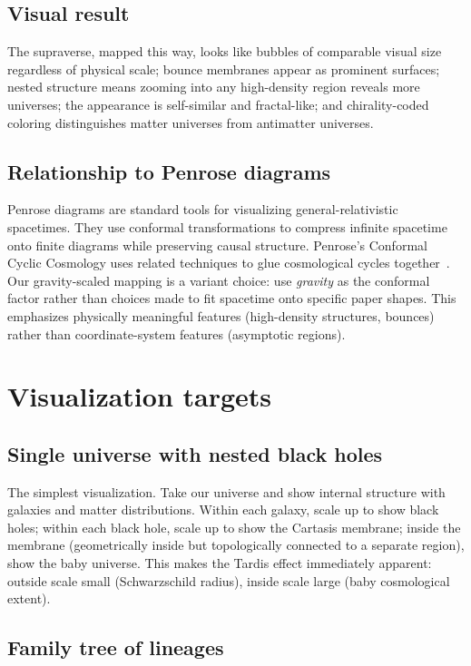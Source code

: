\subsection{Visual result}

The supraverse, mapped this way, looks like bubbles of comparable visual size
regardless of physical scale; bounce membranes appear as prominent surfaces;
nested structure means zooming into any high-density region reveals more
universes; the appearance is self-similar and fractal-like; and chirality-coded
coloring distinguishes matter universes from antimatter universes.

\subsection{Relationship to Penrose diagrams}

Penrose diagrams are standard tools for visualizing general-relativistic
spacetimes. They use conformal transformations to compress infinite spacetime
onto finite diagrams while preserving causal structure. Penrose's Conformal
Cyclic Cosmology uses related techniques to glue cosmological cycles
together~\citep{penrose2010}. Our gravity-scaled mapping is a variant choice: use
\emph{gravity} as the conformal factor rather than choices made to fit spacetime
onto specific paper shapes. This emphasizes physically meaningful features
(high-density structures, bounces) rather than coordinate-system features
(asymptotic regions).

\section{Visualization targets}

\subsection{Single universe with nested black holes}

The simplest visualization. Take our universe and show internal structure with
galaxies and matter distributions. Within each galaxy, scale up to show black
holes; within each black hole, scale up to show the Cartasis membrane; inside the
membrane (geometrically inside but topologically connected to a separate region),
show the baby universe. This makes the Tardis effect immediately apparent:
outside scale small (Schwarzschild radius), inside scale large (baby cosmological
extent).

\subsection{Family tree of lineages}

